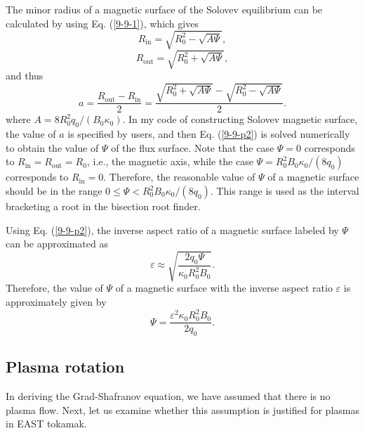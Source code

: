 \documentclass{llncs}
\newcommand{\tmop}[1]{\ensuremath{\operatorname{#1}}}
\begin{document}
The minor radius of a magnetic surface of the Solovev equilibrium can be
calculated by using Eq. (\ref{9-9-1}), which gives
\begin{equation}
  R_{\tmop{in}} = \sqrt{R_0^2 - \sqrt{A \Psi}},
\end{equation}
\begin{equation}
  R_{\tmop{out}} = \sqrt{R_0^2 + \sqrt{A \Psi}},
\end{equation}
and thus
\begin{equation}
  \label{9-9-p2} a = \frac{R_{\tmop{out}} - R_{\tmop{in}}}{2} =
  \frac{\sqrt{R_0^2 + \sqrt{A \Psi}} - \sqrt{R_0^2 - \sqrt{A \Psi}}}{2} .
\end{equation}
where $A = 8 R_0^2 q_0 / (B_0 \kappa_0)$. In my code of constructing Solovev
magnetic surface, the value of $a$ is specified by users, and then Eq.
(\ref{9-9-p2}) is solved numerically to obtain the value of $\Psi$ of the flux
surface. Note that the case $\Psi = 0$ corresponds to $R_{\tmop{in}} =
R_{\tmop{out}} = R_0$, i.e., the magnetic axis, while the case $\Psi = R_0^2
B_0 \kappa_0 / (8 q_0)$ corresponds to $R_{\tmop{in}} = 0$. Therefore, the
reasonable value of $\Psi$ of a magnetic surface should be in the range $0
\leqslant \Psi < R_0^2 B_0 \kappa_0 / (8 q_0)$. This range is used as the
interval bracketing a root in the bisection root finder.

Using Eq. (\ref{9-9-p2}), the inverse aspect ratio of a magnetic surface
labeled by $\Psi$ can be approximated as{\cite{jardin2010}}
\begin{equation}
  \varepsilon \approx \sqrt{\frac{2 q_0 \Psi}{\kappa_0 R_0^2 B_0}} .
\end{equation}
Therefore, the value of $\Psi$ of a magnetic surface with the inverse aspect
ratio $\varepsilon$ is approximately given by
\begin{equation}
  \Psi = \frac{\varepsilon^2 \kappa_0 R_0^2 B_0}{2 q_0} .
\end{equation}
\subsection{Plasma rotation}\label{20-4-7-p2}

In deriving the Grad-Shafranov equation, we have assumed that there is no
plasma flow. Next, let us examine whether this assumption is justified for
plasmas in EAST tokamak.
\end{document}
